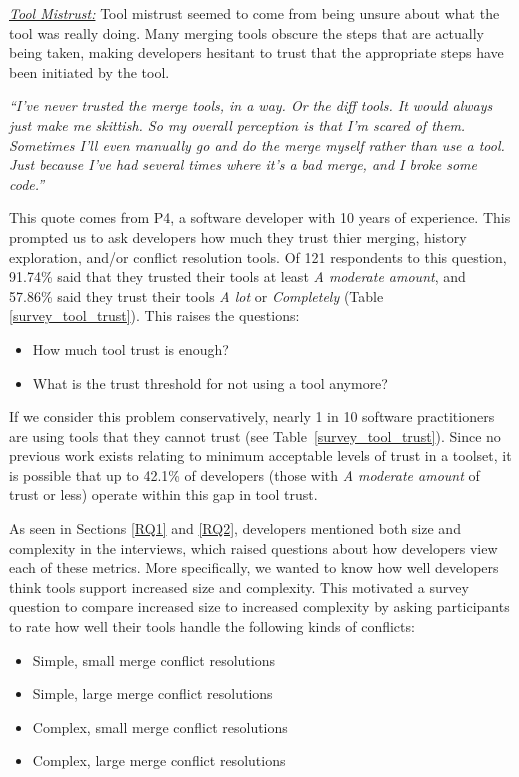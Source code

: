 \underline{\textit{Tool Mistrust:}}
Tool mistrust seemed to come from being unsure about what the tool was really doing. Many merging tools obscure the steps that are actually being taken, making developers hesitant to trust that the appropriate steps have been initiated by the tool. 
\begin{displayquote}
\textit{``I've never trusted the merge tools, in a way. Or the diff tools. It would always just make me skittish. So my overall perception is that I'm scared of them. Sometimes I'll even manually go and do the merge myself rather than use a tool. Just because I've had several times where it's a bad merge, and I broke some code.''}
\end{displayquote}
This quote comes from P4, a software developer with 10 years of experience.
This prompted us to ask developers how much they trust thier merging, history exploration, and/or conflict resolution tools. Of 121 respondents to this question, 91.74\% said that they trusted their tools at least \textit{A moderate amount}, and 57.86\% said they trust their tools \textit{A lot} or \textit{Completely} (Table \ref{survey_tool_trust}). This raises the questions: 
\begin{itemize}
\item How much tool trust is enough? 
\item What is the trust threshold for not using a tool anymore?
\end{itemize}
If we consider this problem conservatively, nearly 1 in 10 software practitioners are using tools that they cannot trust (see Table~\ref{survey_tool_trust}). Since no previous work exists relating to minimum acceptable levels of trust in a toolset, it is possible that up to 42.1\% of developers (those with \textit{A moderate amount} of trust or less) operate within this gap in tool trust.

As seen in Sections \ref{RQ1} and \ref{RQ2}, developers mentioned both size and complexity in the interviews, which raised questions about how developers view each of these metrics. More specifically, we wanted to know how well developers think tools support increased size and complexity.  
This motivated a survey question to compare increased size to increased complexity by asking participants to rate how well their tools handle the following kinds of conflicts:

\begin{itemize}
	\item Simple, small merge conflict resolutions
	\item Simple, large merge conflict resolutions 
	\item Complex, small merge conflict resolutions
	\item Complex, large merge conflict resolutions
\end{itemize}

